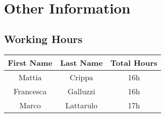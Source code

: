\chapter{Other Information} \label{chap3}

\section{Working Hours}

\begin{table}[htbp]
\begin{center}
\begin{tabular}[t]{ccc}

\hline
\textbf{First Name} & \textbf{Last Name} & \textbf{Total Hours} \\
\hline
Mattia & Crippa &  16h\\
\hline
Francesca & Galluzzi &  16h\\
\hline
Marco & Lattarulo & 17h\\
\hline

\end{tabular}
\end{center}
\end{table}
